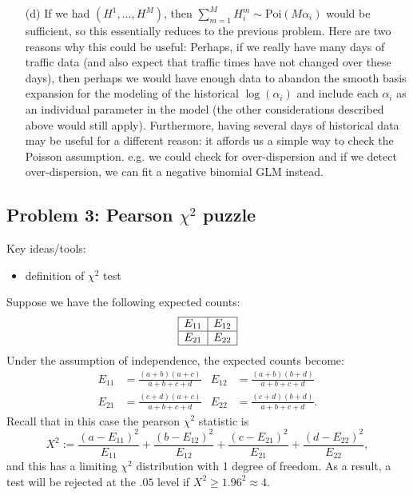 \begin{enumerate}
\item[(d)] If we had $(H^1, \dots, H^M)$, then $\sum_{m = 1}^M H^m_i \sim \text{Poi}(M \alpha_i)$ would be sufficient, so this essentially reduces to the previous problem. Here are two reasons why this could be useful: Perhaps, if we really have many days of traffic data (and also expect that traffic times have not changed over these days), then perhaps we would have enough data to abandon the smooth basis expansion for the modeling of the historical $\log(\alpha_i)$ and include each $\alpha_i$ as an individual parameter in the model (the other considerations described above would still apply).  Furthermore, having several days of historical data may be useful for a	different reason: it affords us a simple way to check the Poisson assumption. e.g. we could check for over-dispersion and if we detect over-dispersion, we can fit a negative binomial GLM instead.

\end{enumerate}


\subsection*{Problem 3: Pearson $\chi^2$ puzzle}
Key ideas/tools:
\begin{itemize}
\item definition of $\chi^2$ test
\end{itemize}

Suppose we have the following expected counts:
$$
\begin{array}{|c|c|}
\hline
E_{11} & E_{12} \\ \hline
E_{21} & E_{22} \\ \hline
\end{array}$$
Under the assumption of independence, the expected counts become:
\begin{align*}
E_{11} &= \frac{(a + b)(a + c)}{a + b + c + d} &
E_{12} &= \frac{(a + b)(b + d)}{a + b + c + d} \\
E_{21} &= \frac{(c + d)(a + c)}{a + b + c + d} &
E_{22} &= \frac{(c + d)(b + d)}{a + b + c + d}.
\end{align*}
Recall that in this case the pearson $\chi^2$ statistic is 
\begin{equation} \label{eq:cs-stat}
X^2 := \frac{(a - E_{11})^2}{E_{11}} + \frac{(b - E_{12})^2}{E_{12}} + \frac{(c- E_{21})^2}{E_{21}} + \frac{(d - E_{22})^2}{E_{22}},
\end{equation}
and this has a limiting $\chi^2$ distribution with 1 degree of freedom. As a result, a test will be rejected at the $.05$ level if $X^2 \ge 1.96^2 \approx 4$.


